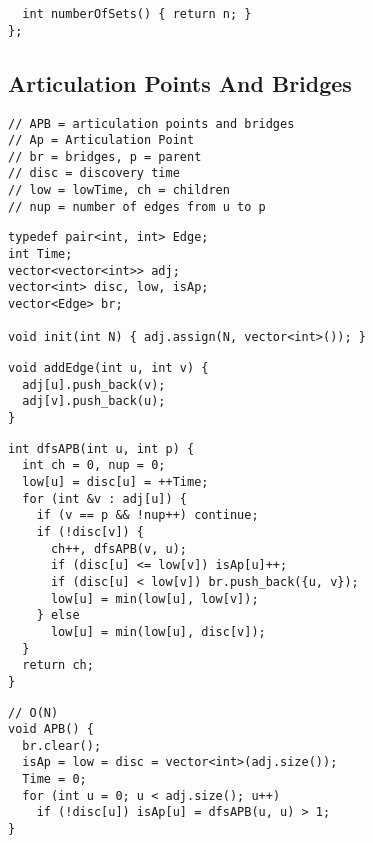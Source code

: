 \documentclass[twoside]{article}
\begin{document}
\begin{multicols*}{2}
\begin{verbatim}
  int numberOfSets() { return n; }
};
\end{verbatim}

{
\subsection*{Articulation Points And Bridges}
}
\begin{verbatim}
// APB = articulation points and bridges
// Ap = Articulation Point
// br = bridges, p = parent
// disc = discovery time
// low = lowTime, ch = children
// nup = number of edges from u to p
\end{verbatim}
\vspace{-12pt}
\begin{verbatim}
typedef pair<int, int> Edge;
int Time;
vector<vector<int>> adj;
vector<int> disc, low, isAp;
vector<Edge> br;

void init(int N) { adj.assign(N, vector<int>()); }
\end{verbatim}
\vspace{-12pt}
\begin{verbatim}
void addEdge(int u, int v) {
  adj[u].push_back(v);
  adj[v].push_back(u);
}
\end{verbatim}
\vspace{-12pt}
\begin{verbatim}
int dfsAPB(int u, int p) {
  int ch = 0, nup = 0;
  low[u] = disc[u] = ++Time;
  for (int &v : adj[u]) {
    if (v == p && !nup++) continue;
    if (!disc[v]) {
      ch++, dfsAPB(v, u);
      if (disc[u] <= low[v]) isAp[u]++;
      if (disc[u] < low[v]) br.push_back({u, v});
      low[u] = min(low[u], low[v]);
    } else
      low[u] = min(low[u], disc[v]);
  }
  return ch;
}
\end{verbatim}
\vspace{-12pt}
\begin{verbatim}
// O(N)
void APB() {
  br.clear();
  isAp = low = disc = vector<int>(adj.size());
  Time = 0;
  for (int u = 0; u < adj.size(); u++)
    if (!disc[u]) isAp[u] = dfsAPB(u, u) > 1;
}
\end{verbatim}


\end{multicols*}
\end{document}
